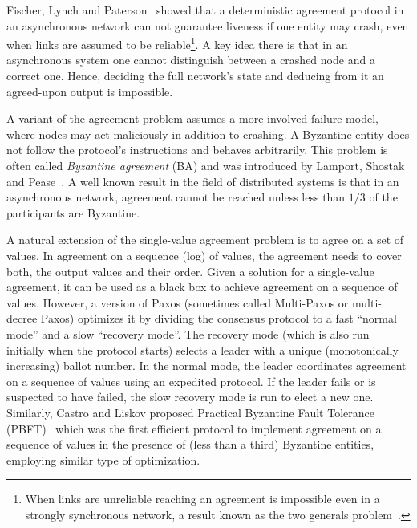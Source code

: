 Fischer, Lynch and Paterson~\cite{FLP} showed that a deterministic agreement protocol in an asynchronous network can not guarantee liveness if one entity may crash, even when links are assumed to be reliable\footnote{When links are unreliable reaching an agreement is impossible even in a strongly synchronous network, a result known as the two generals problem~\cite{2Generals}.}. A key idea there is that in an asynchronous system one cannot distinguish between a crashed node and a correct one. Hence, deciding the full network's state and deducing from it an agreed-upon output is impossible.

A variant of the agreement problem assumes a more involved failure model, where nodes may act maliciously in addition to crashing. A Byzantine entity does not follow the protocol's instructions and behaves arbitrarily. This problem is often called \emph{Byzantine agreement} (BA) and was introduced by Lamport, Shostak and Pease~\cite{GeneralsByzantine}. A well known result in the field of distributed systems is that in an asynchronous network, agreement cannot be reached unless less than $1/3$ of the participants are Byzantine.

A natural extension of the single-value agreement problem is to agree on a set of values. In agreement on a sequence (log) of values, the agreement needs to cover both, the output values and their order. Given a solution for a single-value agreement, it can be used as a black box to achieve agreement on a sequence of values. However, a version of Paxos (sometimes called Multi-Paxos or multi-decree Paxos) optimizes it by dividing the consensus protocol to a fast ``normal mode” and a slow ``recovery mode”. The recovery mode (which is also run initially when the protocol starts) selects a leader with a unique (monotonically increasing) ballot number. In the normal mode, the leader coordinates agreement on a sequence of values using an expedited protocol. If the leader fails or is suspected to have failed, the slow recovery mode is run to elect a new one. Similarly, Castro and Liskov proposed Practical Byzantine Fault Tolerance (PBFT)~\cite{PBFT} which was the first efficient protocol to implement agreement on a sequence of values in the presence of (less than a third) Byzantine entities, employing similar type of optimization.



